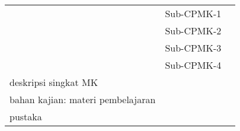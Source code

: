 \documentclass[12pt, landscape]{simrep} %
\begin{document}
\begin{longtable}{*{8}{P{1.15in}}@{}}
                                               \midrule

	                                           & Sub-CPMK-1                                                   &                                                                                                       \\


	                                           & Sub-CPMK-2                                                   &                                                                                                       \\

	                                           & Sub-CPMK-3                                                   &                                                                                                       \\

	                                           & Sub-CPMK-4                                                   &                                                                                                       \\

                                               \midrule
	deskripsi singkat MK                       &                                                                                                                                                                      \\

                                               \midrule

	bahan kajian: materi pembelajaran          &                                                                                                                                                                      \\
                                               \midrule
	pustaka                                    &                                                                                                                                                                        \\
                                               \midrule


\end{longtable}
\end{document}

